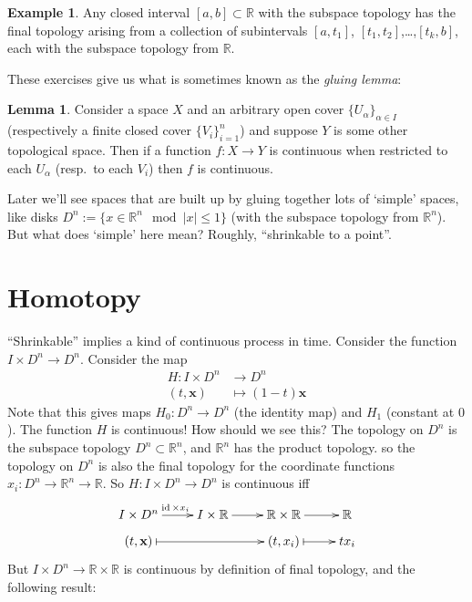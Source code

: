 \documentclass{tufte-handout}
\def\RR{\mathbb{R}}
\DeclareMathOperator{\id}{id}
\theoremstyle{definition}
\newtheorem{lemma}{Lemma}
\newtheorem{example}{Example}
\begin{document}
\begin{example}\label{example:interval_final_topology}
Any closed interval $[a,b]\subset \RR$ with the subspace topology has the final topology 
arising from a collection of subintervals $[a,t_1]$, $[t_1,t_2]$,\ldots,$[t_k,b]$, each
with the subspace topology from $\RR$.
\end{example}

These exercises give us what is sometimes known as the \emph{gluing lemma}:

\begin{lemma}\label{lemma:gluing_lemma}
Consider a space $X$ and an arbitrary open cover $\{U_\alpha\}_{\alpha\in I}$ 
(respectively a finite closed cover $\{V_i\}_{i=1}^n$) and suppose $Y$ is some other 
topological space. Then if a function $f\colon X\to Y$ is continuous when restricted to each 
$U_\alpha$ (resp.\ to each $V_i$) then $f$ is continuous.
\end{lemma}

Later we'll see spaces that are built up by gluing together lots 
of `simple' spaces, like disks $D^n := \{x\in \RR^n\mod |x|\leq 1\}$ (with the subspace 
topology from $\RR^n$). But what does `simple' here mean? Roughly, ``shrinkable to a 
point''.

\section{Homotopy}

``Shrinkable'' implies a kind of continuous process in time. Consider the function $I\times D^n \to D^n$. Consider the map
\begin{align*}
	H\colon I \times D^n & \to D^n\\
	(t,\mathbf{x}) & \mapsto (1-t)\mathbf{x}
\end{align*}
Note that this gives maps $H_0\colon D^n\to D^n$ (the identity map) and $H_1$ (constant at $0$).
The function $H$ is continuous! 
How should we see this? 
The topology on $D^n$ is the subspace topology $D^n \subset \RR^n$,\marginnote{And $I\subset \RR$ has subspace topology}  and $\RR^n$ has the product topology. 
so the topology on $D^n$ is also the final topology for the coordinate functions 
$x_i\colon D^n \to \RR^n \to \RR$. 
So $H\colon I\times D^n \to D^n$ is continuous iff
\[
	\xymatrix@R=0.5pc{
	I\times D^n \ar[r]^{\id\times x_i} & I\times \RR \ar[r]& \RR\times\RR \ar[r]& \RR\\
	(t,\mathbf{x}) \ar@{|->}[rr] && (t,x_i) \ar@{|->}[r] & tx_i 
	}
\]
But $I\times D^n \to \RR \times \RR$ is continuous by definition of final topology, and the following result:
\end{document}
